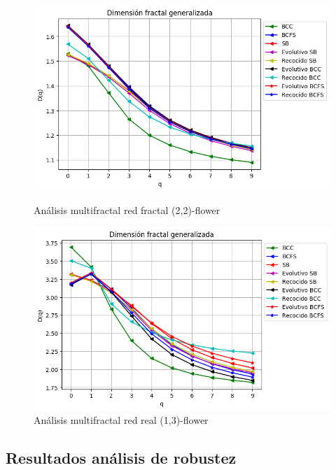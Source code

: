 \begin{figure}[!htb]
    \begin{minipage}{0.48\textwidth}
        \centering
        \includegraphics[scale=0.5]{CapituloAAnexos/imagenesAnexoC/Fractalidad/grafica_Dq20180511_101739floweru2v2.png}
        \caption{Análisis multifractal red fractal (2,2)-flower}
    \end{minipage}\hfill
   \begin{minipage}{0.48\textwidth}
         \centering
        \includegraphics[scale=0.5]{CapituloAAnexos/imagenesAnexoC/Fractalidad/grafica_Dq20180509_000454floweru1v3.png}
    \caption{Análisis multifractal red real (1,3)-flower}
    \end{minipage}
\end{figure}

\newpage
\subsection*{Resultados análisis de robustez}


